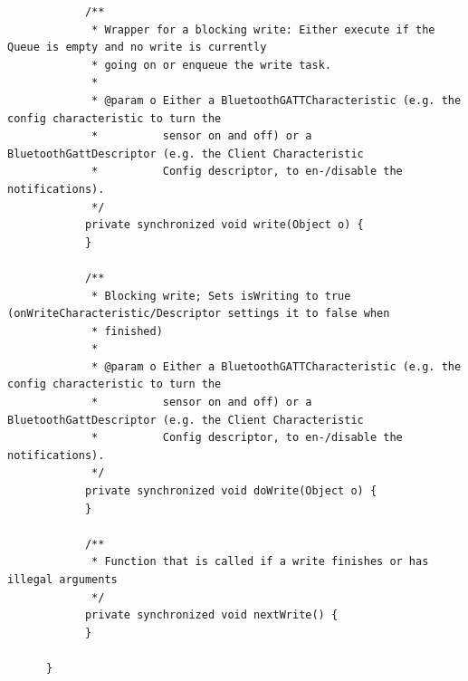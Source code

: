 \begin{lstlisting}
            /**
             * Wrapper for a blocking write: Either execute if the Queue is empty and no write is currently
             * going on or enqueue the write task.
             *
             * @param o Either a BluetoothGATTCharacteristic (e.g. the config characteristic to turn the
             *          sensor on and off) or a BluetoothGattDescriptor (e.g. the Client Characteristic
             *          Config descriptor, to en-/disable the notifications).
             */
            private synchronized void write(Object o) {
            }

            /**
             * Blocking write; Sets isWriting to true (onWriteCharacteristic/Descriptor settings it to false when
             * finished)
             *
             * @param o Either a BluetoothGATTCharacteristic (e.g. the config characteristic to turn the
             *          sensor on and off) or a BluetoothGattDescriptor (e.g. the Client Characteristic
             *          Config descriptor, to en-/disable the notifications).
             */
            private synchronized void doWrite(Object o) {
            }

            /**
             * Function that is called if a write finishes or has illegal arguments
             */
            private synchronized void nextWrite() {
            }

      }
    \end{lstlisting}
